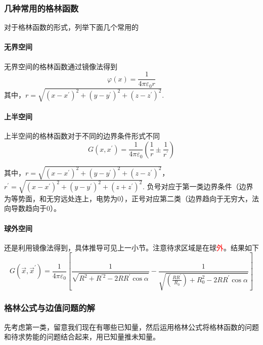 \documentclass[UTF8]{ctexart}
\newcommand{\red}{\textcolor{red}}
\begin{document}
    \subsubsection{几种常用的格林函数}
    对于格林函数的形式，列举下面几个常用的
    \paragraph{无界空间} 
    无界空间的格林函数通过镜像法得到
    \begin{equation}
        \varphi(x) = \frac{1}{4 \pi \varepsilon_0 r}
    \end{equation}
\noindent 其中，$r = \sqrt{(x-x^{\prime})^2 + (y-y^{\prime})^2 +(z-z^{\prime})^2}$.

    \paragraph{上半空间}
    上半空间的格林函数对于不同的边界条件形式不同
    \begin{equation}
        G(x,x^{\prime}) = \frac{1}{4 \pi \varepsilon_0} \left(\frac{1}{r} \pm \frac{1}{r^{\prime}}\right)
    \end{equation}
    
\noindent 其中，$r= \sqrt{(x-x^{\prime})^2 + (y-y^{\prime})^2 +(z-z^{\prime})^2}$，$r^{\prime}= \sqrt{(x-x^{\prime})^2 + (y-y^{\prime})^2 +(z+z^{\prime})^2}$. 负号对应于第一类边界条件（边界为等势面，和无穷远处连上，电势为0），正号对应第二类（边界趋向于无穷大，法向导数趋向于0）。

    \paragraph{球外空间}
    还是利用镜像法得到，具体推导可见上一小节。注意待求区域是在球\red{外}。结果如下
    \begin{equation}
        G(\vec{x},\vec{x}^{\prime}) = \frac{1}{4 \pi \varepsilon_0}\left[\frac{1}{\sqrt{R^2 + R^{\prime 2} - 2 R R^{\prime} \cos \alpha}} - \frac{1}{\sqrt{\left(\frac{R R^{\prime}}{R_0}\right) + R_0^2 - 2 R R^{\prime} \cos \alpha}}\right]
    \end{equation}

    \subsubsection{格林公式与边值问题的解}
    先考虑第一类，留意我们现在有哪些已知量，然后运用格林公式将格林函数的问题和待求势能的问题结合起来，用已知量推未知量。
\end{document}
